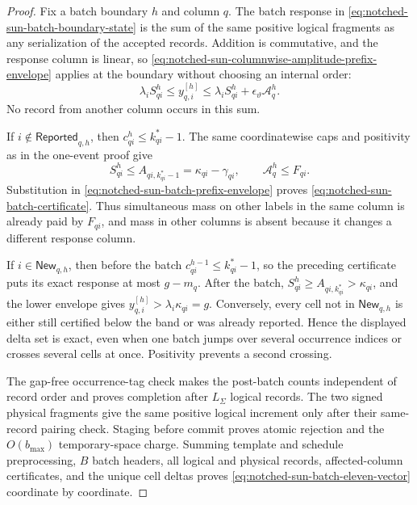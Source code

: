 \begin{proof}
Fix a batch boundary $h$ and column $q$.  The batch response in
\cref{eq:notched-sun-batch-boundary-state} is the sum of the same positive
logical fragments as any serialization of the accepted records.  Addition is
commutative, and the response column is linear, so
\cref{eq:notched-sun-columnwise-amplitude-prefix-envelope} applies at the
boundary without choosing an internal order:
\begin{equation}
 \lambda_iS_{qi}^{h}
 \leq y_{q,i}^{[h]}
 \leq\lambda_iS_{qi}^{h}+\epsilon_\vartheta\mathcal A_q^{h}.
 \label{eq:notched-sun-batch-prefix-envelope}
\end{equation}
No record from another column occurs in this sum.

If $i\notin\mathsf{Reported}_{q,h}$, then
$c_{qi}^{h}\leq k_{qi}^*-1$.  The same coordinatewise caps and positivity as
in the one-event proof give
\begin{equation*}
 S_{qi}^{h}\leq A_{qi,k_{qi}^*-1}
 =\kappa_{qi}-\gamma_{qi},
 \qquad
 \mathcal A_q^{h}\leq F_{qi}.
\end{equation*}
Substitution in \cref{eq:notched-sun-batch-prefix-envelope} proves
\cref{eq:notched-sun-batch-certificate}.  Thus simultaneous mass on other
labels in the same column is already paid by $F_{qi}$, and mass in other
columns is absent because it changes a different response column.

If $i\in\mathsf{New}_{q,h}$, then before the batch
$c_{qi}^{h-1}\leq k_{qi}^*-1$, so the preceding certificate puts its exact
response at most $g-m_q$.  After the batch,
$S_{qi}^{h}\geq A_{qi,k_{qi}^*}>\kappa_{qi}$, and the lower envelope gives
$y_{q,i}^{[h]}>\lambda_i\kappa_{qi}=g$.  Conversely, every cell not in
$\mathsf{New}_{q,h}$ is either still certified below the band or was already
reported.  Hence the displayed delta set is exact, even when one batch jumps
over several occurrence indices or crosses several cells at once.  Positivity
prevents a second crossing.

The gap-free occurrence-tag check makes the post-batch counts independent of
record order and proves completion after $L_\Sigma$ logical records.  The
two signed physical fragments give the same positive logical increment only
after their same-record pairing check.  Staging before commit proves atomic
rejection and the $O(b_{\max})$ temporary-space charge.  Summing template and
schedule preprocessing, $B$ batch headers, all logical and physical records,
affected-column certificates, and the unique cell deltas proves
\cref{eq:notched-sun-batch-eleven-vector} coordinate by coordinate.
\end{proof}

